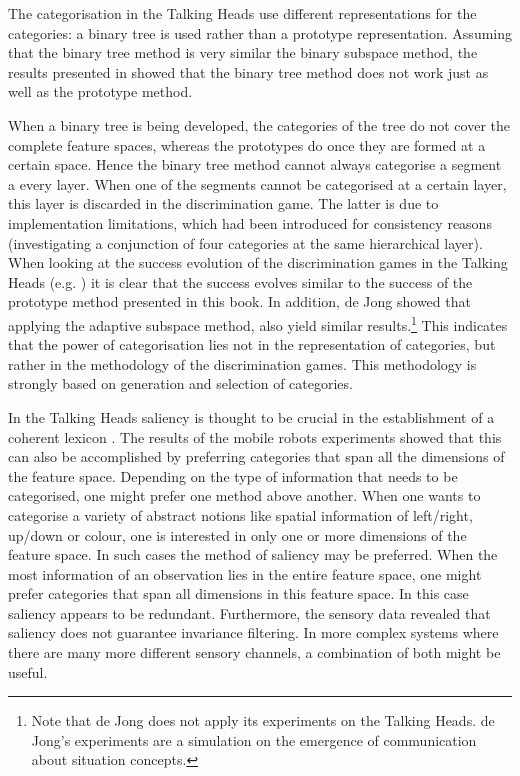 The categorisation in the Talking Heads use different representations for the categories: a binary tree is used rather than a prototype representation. Assuming that the binary tree method is very similar the binary subspace method, the results presented in  showed that the binary tree method does not work just as well as the prototype method.

When a binary tree is being developed, the categories of the tree do not cover the complete feature spaces, whereas the prototypes do once they are formed at a certain space. Hence the binary tree method cannot always categorise a segment a every layer. When one of the segments cannot be categorised at a certain layer, this layer is discarded in the discrimination game. The latter is due to implementation limitations, which had been introduced for consistency reasons (investigating a conjunction of four categories at the same hierarchical layer). When looking at the success evolution of the discrimination games in the Talking Heads (e.g. \citealt{steels:2000}) it is clear that the success evolves similar to the success of the prototype method presented in this book. In addition, de Jong \citep{dejongvogt:1998,dejong:2000} showed that applying  the {\sc adaptive subspace method}, also yield similar results.\footnote{Note that de Jong does not apply its experiments on the Talking Heads. de Jong's experiments are a simulation on the emergence of communication about {\sc situation concepts}.} This indicates that the power of categorisation lies not in the representation of categories, but rather in the methodology of the discrimination games. This methodology is strongly based on generation and selection of categories.


In the Talking Heads saliency is thought to be crucial in the establishment of a coherent lexicon \citep{steels:2000}. The results of the mobile robots experiments showed that this can also be accomplished by preferring categories that span all the dimensions of the feature space. Depending on the type of information that needs to be categorised, one might prefer one method above another. When one wants to categorise a variety of abstract notions like spatial information of left/right, up/down or colour, one is interested in only one or more dimensions of the feature space. In such cases the method of saliency may be preferred. When the most information of an observation lies in the entire feature space, one might prefer categories that span all dimensions in this feature space. In this case saliency appears to be redundant. Furthermore, the sensory data revealed that saliency does not guarantee invariance filtering. In more complex systems where there are many more different sensory channels, a combination of both might be useful.


